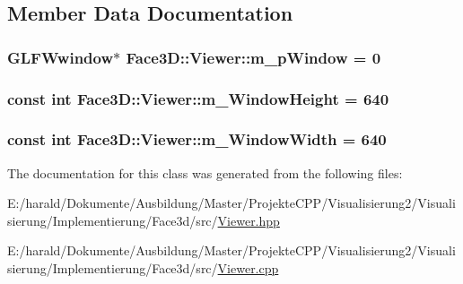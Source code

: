 \subsection{Member Data Documentation}
\subsubsection[{\texorpdfstring{m\+\_\+p\+Window}{m_pWindow}}]{\setlength{\rightskip}{0pt plus 5cm}G\+L\+F\+Wwindow$\ast$ Face3\+D\+::\+Viewer\+::m\+\_\+p\+Window = 0\hspace{0.3cm}{\ttfamily [private]}}\hypertarget{class_face3_d_1_1_viewer_aa0a9660c0c04a81a2ea3bfdffae5d301}{}\label{class_face3_d_1_1_viewer_aa0a9660c0c04a81a2ea3bfdffae5d301}
\subsubsection[{\texorpdfstring{m\+\_\+\+Window\+Height}{m_WindowHeight}}]{\setlength{\rightskip}{0pt plus 5cm}const int Face3\+D\+::\+Viewer\+::m\+\_\+\+Window\+Height = 640\hspace{0.3cm}{\ttfamily [private]}}\hypertarget{class_face3_d_1_1_viewer_ac27129a2e48a533919fad7dc1c307452}{}\label{class_face3_d_1_1_viewer_ac27129a2e48a533919fad7dc1c307452}
\subsubsection[{\texorpdfstring{m\+\_\+\+Window\+Width}{m_WindowWidth}}]{\setlength{\rightskip}{0pt plus 5cm}const int Face3\+D\+::\+Viewer\+::m\+\_\+\+Window\+Width = 640\hspace{0.3cm}{\ttfamily [private]}}\hypertarget{class_face3_d_1_1_viewer_abf178984caeed65a69fcf7f0073147f4}{}\label{class_face3_d_1_1_viewer_abf178984caeed65a69fcf7f0073147f4}


The documentation for this class was generated from the following files\+:\begin{DoxyCompactItemize}
\item 
E\+:/harald/\+Dokumente/\+Ausbildung/\+Master/\+Projekte\+C\+P\+P/\+Visualisierung2/\+Visualisierung/\+Implementierung/\+Face3d/src/\hyperlink{_viewer_8hpp}{Viewer.\+hpp}\item 
E\+:/harald/\+Dokumente/\+Ausbildung/\+Master/\+Projekte\+C\+P\+P/\+Visualisierung2/\+Visualisierung/\+Implementierung/\+Face3d/src/\hyperlink{_viewer_8cpp}{Viewer.\+cpp}\end{DoxyCompactItemize}

